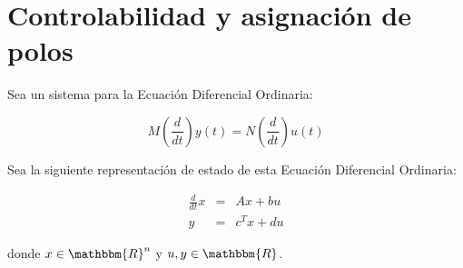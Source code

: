 
\chapter{Controlabilidad y asignación de polos}

    Sea un sistema para la Ecuación Diferencial Ordinaria:

    \begin{equation}
        M \left(\frac{d}{dt} \right) y(t) = N \left(\frac{d}{dt} \right) u(t)
    \end{equation}

    Sea la siguiente representación de estado de esta Ecuación Diferencial Ordinaria:

    \begin{eqnarray}
    \frac{d}{dt} x & = & A x + b u \nonumber \\
    y & = & c^T x + d u \nonumber
    \end{eqnarray}

    donde $x \in \mathbbm{R}^n$ y $u,y \in \mathbbm{R}$.

